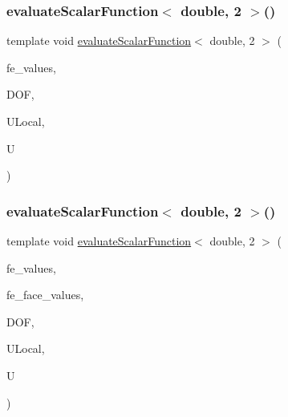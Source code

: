 \mbox{\label{function_evaluations_8cc_a675557db3f31c27e2c45a8bee20dd42a}} 
\subsubsection{\texorpdfstring{evaluate\+Scalar\+Function$<$ double, 2 $>$()}{evaluateScalarFunction< double, 2 >()}\hspace{0.1cm}{\footnotesize\ttfamily [1/2]}}
{\footnotesize\ttfamily template void \mbox{\hyperlink{group___evaluation_functions_ga2e2fbeb2173113c6889c73bbb7304789}{evaluate\+Scalar\+Function}}$<$ double, 2 $>$ (\begin{DoxyParamCaption}\item[{const F\+E\+Values$<$ 2 $>$ \&}]{fe\+\_\+values,  }\item[{unsigned int}]{D\+OF,  }\item[{Table$<$ 1, double $>$ \&}]{U\+Local,  }\item[{Table$<$ 1, double $>$ \&}]{U }\end{DoxyParamCaption})}

\mbox{\label{function_evaluations_8cc_a9d228a6175fb599a42cf7a0721ad2f32}} 
\subsubsection{\texorpdfstring{evaluate\+Scalar\+Function$<$ double, 2 $>$()}{evaluateScalarFunction< double, 2 >()}\hspace{0.1cm}{\footnotesize\ttfamily [2/2]}}
{\footnotesize\ttfamily template void \mbox{\hyperlink{group___evaluation_functions_ga2e2fbeb2173113c6889c73bbb7304789}{evaluate\+Scalar\+Function}}$<$ double, 2 $>$ (\begin{DoxyParamCaption}\item[{const F\+E\+Values$<$ 2 $>$ \&}]{fe\+\_\+values,  }\item[{const F\+E\+Face\+Values$<$ 2 $>$ \&}]{fe\+\_\+face\+\_\+values,  }\item[{unsigned int}]{D\+OF,  }\item[{Table$<$ 1, double $>$ \&}]{U\+Local,  }\item[{Table$<$ 1, double $>$ \&}]{U }\end{DoxyParamCaption})}

